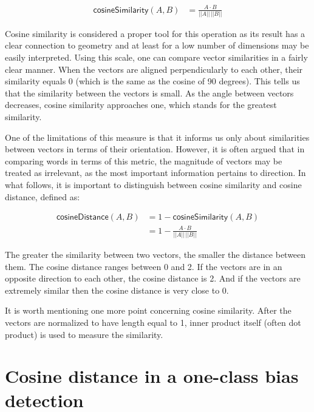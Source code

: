 \documentclass[12pt,]{book}
\begin{document}
\begin{align} \tag{Sim}
\mathsf{cosineSimilarity}(A,B) & = \frac{A \cdot B}{\vert \vert A \vert \vert \,\vert \vert B \vert \vert}
\end{align}

Cosine similarity is considered a proper tool for this operation as its
result has a clear connection to geometry and at least for a low number
of dimensions may be easily interpreted. Using this scale, one can
compare vector similarities in a fairly clear manner. When the vectors
are aligned perpendicularly to each other, their similarity equals 0
(which is the same as the cosine of 90 degrees). This tells us that the
similarity between the vectors is small. As the angle between vectors
decreases, cosine similarity approaches one, which stands for the
greatest similarity.

One of the limitations of this measure is that it informs us only about
similarities between vectors in terms of their orientation. However, it
is often argued that in comparing words in terms of this metric, the
magnitude of vectors may be treated as irrelevant, as the most important
information pertains to direction. In what follows, it is important to
distinguish between cosine similarity and cosine distance, defined as:

\begin{align} \tag{Sim}
\mathsf{cosineDistance}(A,B) &  = 1 - \mathsf{cosineSimilarity}(A,B)\\
 &  = 1 - \frac{A \cdot B}{\vert \vert A \vert \vert \,\vert \vert B \vert \vert} \nonumber
\end{align}

The greater the similarity between two vectors, the smaller the distance
between them. The cosine distance ranges between 0 and 2. If the vectors
are in an opposite direction to each other, the cosine distance is 2.
And if the vectors are extremely similar then the cosine distance is
very close to 0.

It is worth mentioning one more point concerning cosine similarity.
After the vectors are normalized to have length equal to 1, inner
product itself (often dot product) is used to measure the similarity.

\section{Cosine distance in a one-class bias
detection}\label{cosine-distance-in-a-one-class-bias-detection}
\end{document}
